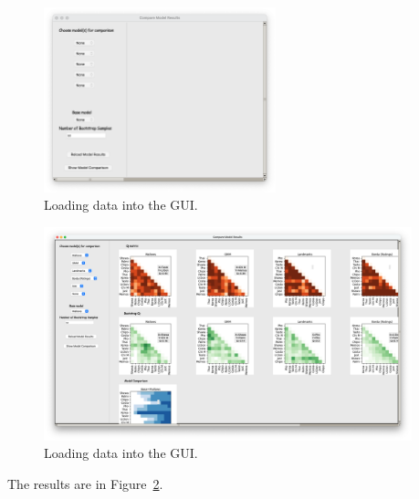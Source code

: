 \documentclass[a4paper,11pt]{memoir}
\begin{document}
  \begin{figure}[h]
    \begin{center}
      \includegraphics[width=0.6\textwidth]{art/summary_1.png}
      \caption{Loading data into the GUI.}\label{fig:summary1}
    \end{center}
  \end{figure}


  \begin{figure}[h]
    \begin{center}
      \includegraphics[width=0.95\textwidth]{art/summary_2.png}
      \caption{Loading data into the GUI.}\label{fig:summary2}
    \end{center}
  \end{figure}

The results are in Figure~\ref{fig:summary2}.















\end{document}
